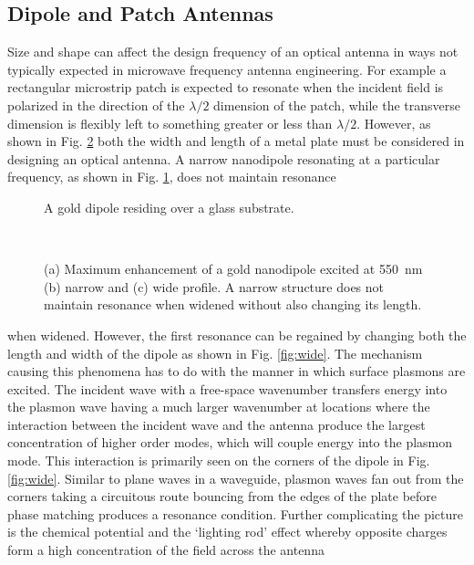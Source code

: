 \subsection{Dipole and Patch Antennas}
%
Size and shape can affect the design frequency of an optical antenna in ways not typically expected in microwave frequency antenna engineering. For example a rectangular microstrip patch is expected to resonate when the incident field is polarized in the direction of the $\lambda/2$ dimension of the patch, while the transverse dimension is flexibly left to something greater or less than $\lambda/2$. However, as shown in Fig. \ref{fig:simulation} both the width and length of a metal plate must be considered in designing an optical antenna. A narrow nanodipole resonating at a particular frequency, as shown in Fig. \ref{fig:nitin_dipole}, does not maintain resonance
%
\begin{figure}[b!]
  \centering
  \def\svgwidth{.75\linewidth}
  
  \caption{A gold dipole residing over a glass substrate.}
  \label{fig:nitin_dipole}
\end{figure}
%
\begin{figure}[t!]
  \centering
  \\
  \centering
   \hfil
   \hfil
  \caption{(a) Maximum enhancement of a gold nanodipole excited at \SI{550}{\nm} (b) narrow and (c) wide profile. A narrow structure does not maintain resonance when widened without also changing its length.}
  \label{fig:simulation}
\end{figure}
%
when widened. However, the first resonance can be regained by changing both the length and width of the dipole as shown in Fig. \ref{fig:wide}. The mechanism causing this phenomena has to do with the manner in which surface plasmons are excited. The incident wave with a free-space wavenumber transfers energy into the plasmon wave having a much larger wavenumber at locations where the interaction between the incident wave and the antenna produce the largest concentration of higher order modes, which will couple energy into the plasmon mode. This interaction is primarily seen on the corners of the dipole in Fig. \ref{fig:wide}. Similar to plane waves in a waveguide, plasmon waves fan out from the corners taking a circuitous route bouncing from the edges of the plate before phase matching produces a resonance condition. Further complicating the picture is the chemical potential and the `lighting rod' effect whereby opposite charges form a high concentration of the field across the antenna
